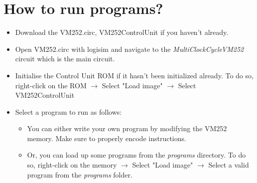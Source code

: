\documentclass{article}
\begin{document}
\section{How to run programs?}
\begin{itemize}
    \item Download the VM252.circ, VM252ControlUnit if you haven't already.
    \item Open VM252.circ with logisim and navigate to the \textit{MultiClockCycleVM252} circuit which is the main circuit.
    \item Initialise the Control Unit ROM if it hasn't been initialized already. To do so, right-click on the ROM $\rightarrow$ Select "Load image" $\rightarrow$ Select VM252ControlUnit
    \item Select a program to run as follows:
    \begin{itemize}
        \item You can either write your own program by modifying the VM252 memory. Make sure to properly encode instructions.
        \item Or, you can load up some programs from the \textit{programs} directory. To do so, right-click on the memory $\rightarrow$ Select "Load image" $\rightarrow$ Select a valid program from the \textit{programs} folder.
    \end{itemize}
\end{itemize}
\end{document}
